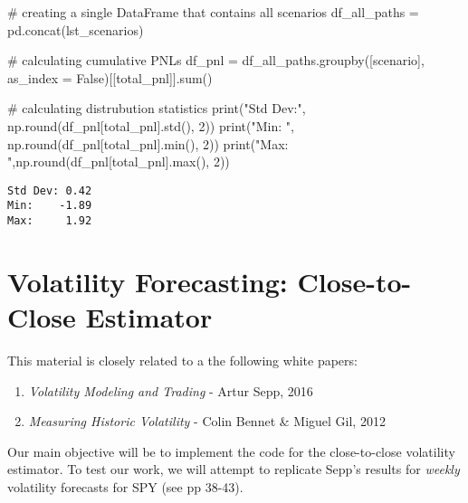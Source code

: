 \documentclass[
  letterpaper,
  DIV=11,
  numbers=noendperiod]{scrreprt}
\newenvironment{Shaded}{\begin{snugshade}}{\end{snugshade}}
\newcommand{\BuiltInTok}[1]{\textcolor[rgb]{0.00,0.23,0.31}{#1}}
\newcommand{\CommentTok}[1]{\textcolor[rgb]{0.37,0.37,0.37}{#1}}
\newcommand{\DecValTok}[1]{\textcolor[rgb]{0.68,0.00,0.00}{#1}}
\newcommand{\NormalTok}[1]{\textcolor[rgb]{0.00,0.23,0.31}{#1}}
\newcommand{\OperatorTok}[1]{\textcolor[rgb]{0.37,0.37,0.37}{#1}}
\newcommand{\StringTok}[1]{\textcolor[rgb]{0.13,0.47,0.30}{#1}}
\newcommand{\VariableTok}[1]{\textcolor[rgb]{0.07,0.07,0.07}{#1}}
\begin{document}
\begin{Shaded}
\begin{Highlighting}[]
\CommentTok{\# creating a single DataFrame that contains all scenarios    }
\NormalTok{df\_all\_paths }\OperatorTok{=}\NormalTok{ pd.concat(lst\_scenarios)}

\CommentTok{\# calculating cumulative PNLs}
\NormalTok{df\_pnl }\OperatorTok{=}\NormalTok{ df\_all\_paths.groupby([}\StringTok{\textquotesingle{}scenario\textquotesingle{}}\NormalTok{], as\_index }\OperatorTok{=} \VariableTok{False}\NormalTok{)[[}\StringTok{\textquotesingle{}total\_pnl\textquotesingle{}}\NormalTok{]].}\BuiltInTok{sum}\NormalTok{()}

\CommentTok{\# calculating distrubution statistics}
\BuiltInTok{print}\NormalTok{(}\StringTok{"Std Dev:"}\NormalTok{, np.}\BuiltInTok{round}\NormalTok{(df\_pnl[}\StringTok{\textquotesingle{}total\_pnl\textquotesingle{}}\NormalTok{].std(), }\DecValTok{2}\NormalTok{))}
\BuiltInTok{print}\NormalTok{(}\StringTok{"Min:   "}\NormalTok{, np.}\BuiltInTok{round}\NormalTok{(df\_pnl[}\StringTok{\textquotesingle{}total\_pnl\textquotesingle{}}\NormalTok{].}\BuiltInTok{min}\NormalTok{(), }\DecValTok{2}\NormalTok{))}
\BuiltInTok{print}\NormalTok{(}\StringTok{"Max:    "}\NormalTok{,np.}\BuiltInTok{round}\NormalTok{(df\_pnl[}\StringTok{\textquotesingle{}total\_pnl\textquotesingle{}}\NormalTok{].}\BuiltInTok{max}\NormalTok{(), }\DecValTok{2}\NormalTok{))}
\end{Highlighting}
\end{Shaded}

\begin{verbatim}
Std Dev: 0.42
Min:    -1.89
Max:     1.92
\end{verbatim}

\hypertarget{volatility-forecasting-close-to-close-estimator}{%
\chapter{Volatility Forecasting: Close-to-Close
Estimator}\label{volatility-forecasting-close-to-close-estimator}}

This material is closely related to a the following white papers:

\begin{enumerate}
\def\labelenumi{\arabic{enumi}.}
\item
  \emph{Volatility Modeling and Trading} - Artur Sepp, 2016
\item
  \emph{Measuring Historic Volatility} - Colin Bennet \& Miguel Gil,
  2012
\end{enumerate}

Our main objective will be to implement the code for the close-to-close
volatility estimator. To test our work, we will attempt to replicate
Sepp's results for \emph{weekly} volatility forecasts for SPY (see pp
38-43).
\end{document}
